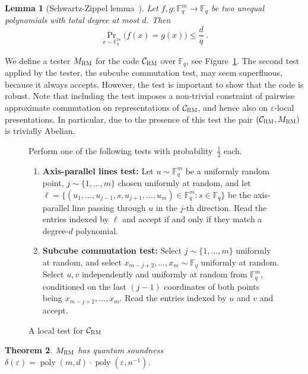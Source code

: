 \documentclass[11pt]{article}
\newtheorem{theorem}{Theorem}[section]
\newtheorem{lemma}[theorem]{Lemma}
\theoremstyle{definition}
\newcommand{\code}{\mathcal{C}}
\newcommand{\F}{\ensuremath{\mathbb{F}}}
\newcommand{\mC}{\ensuremath{\mathcal{C}}}
\newcommand{\RM}{\ensuremath{\textsc{RM}}}
\DeclareMathOperator{\poly}{poly}
\newcommand{\eps}{\varepsilon}
\newenvironment{gamespec}{
  \begin{mdframed}[style=figstyle]}{
  \end{mdframed}}
\begin{document}
\begin{lemma}[Schwartz-Zippel lemma~\cite{Sch80,Zip79}]
  \label{lem:schwartz-zippel}
  Let $f, g: \F_q^m \to \F_q$ be two unequal polynomials with total degree at most $d$. Then
  \begin{equation*}
    \Pr_{x \sim \F_q^m}\big(f(x) = g(x)\big) \leq \frac{d}{q}\;.
  \end{equation*}
\end{lemma}


We define a tester $M_{\RM}$ for the code $\mC_\RM$ over $\F_q$, see Figure~\ref{fig:RM-tester}. The second test applied by the tester, the subcube commutation test, may seem superfluous, because it always accepts. However, the test is important to show that the code is robust. Note that including the test imposes a non-trivial constraint of pairwise approximate commutation on representations of $\mC_\RM$, and hence also on $\eps$-local presentations. In particular, due to the presence of this test the pair $(\code_\RM,M_\RM)$ is trivially Abelian. 


\begin{figure}[!htbp]
  \centering
  \begin{gamespec}
Perform one of the following tests with probability~$\tfrac{1}{2}$ each. 
\begin{enumerate}
	\item \textbf{Axis-parallel lines test:}
		Let $u \sim \F_q^m$ be a uniformly random point, $j\sim \{1,\ldots,m\}$ chosen uniformly at random,
		and let $\ell = \{ (u_1,\ldots,u_{j-1},s,u_{j+1},\ldots,u_m) \in \F_q^m : s \in \F_q \}$
		be the axis-parallel line passing through $u$ in the $j$-th direction. Read the entries indexed by $\ell$ and accept if and only if they match a degree-$d$ polynomial. 
	\item \textbf{Subcube commutation test:}
	Select $j \sim \{1,\ldots,m\}$ uniformly at random, and select $x_{m-j+2},\ldots,x_{m} \sim \F_q$ uniformly at random. Select $u,v$ independently and uniformly at random from $\F_q^m$, conditioned on the last $(j-1)$ coordinates of both points being $x_{m-j+2},\ldots,x_m$. Read the entries indexed by $u$ and $v$ and accept. 	
    \end{enumerate}
  \end{gamespec}
  \caption{A local test for $\code_{\RM}$}
  \label{fig:RM-tester}
\end{figure}



\begin{theorem}\label{thm:mrm-sound}
$M_\RM$ has quantum soundness $\delta(\eps)=\poly(m,d)\cdot \poly(\eps,n^{-1})$.
\end{theorem}
\end{document}

